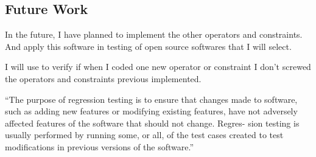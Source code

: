 \subsection{Future Work}

In the future, I have planned to implement the other operators and constraints. And apply this software in testing of open source softwares that I will select.

I will use  to verify if when I coded one new operator or constraint I don't screwed the operators and constraints previous implemented.

``The purpose of regression testing is to ensure that changes made to software, such as adding new features or modifying existing features, have not adversely affected features of the software that should not change. Regres- sion testing is usually performed by running some, or all, of the test cases created to test modifications in previous versions of the software.''



